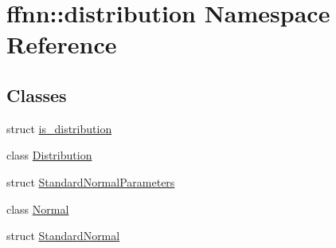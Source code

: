 \hypertarget{namespaceffnn_1_1distribution}{\section{ffnn\-:\-:distribution Namespace Reference}
\label{namespaceffnn_1_1distribution}
}
\subsection*{Classes}
\begin{DoxyCompactItemize}
\item 
struct \hyperlink{structffnn_1_1distribution_1_1is__distribution}{is\-\_\-distribution}
\item 
class \hyperlink{classffnn_1_1distribution_1_1_distribution}{Distribution}
\item 
struct \hyperlink{structffnn_1_1distribution_1_1_standard_normal_parameters}{Standard\-Normal\-Parameters}
\item 
class \hyperlink{classffnn_1_1distribution_1_1_normal}{Normal}
\item 
struct \hyperlink{structffnn_1_1distribution_1_1_standard_normal}{Standard\-Normal}
\end{DoxyCompactItemize}
